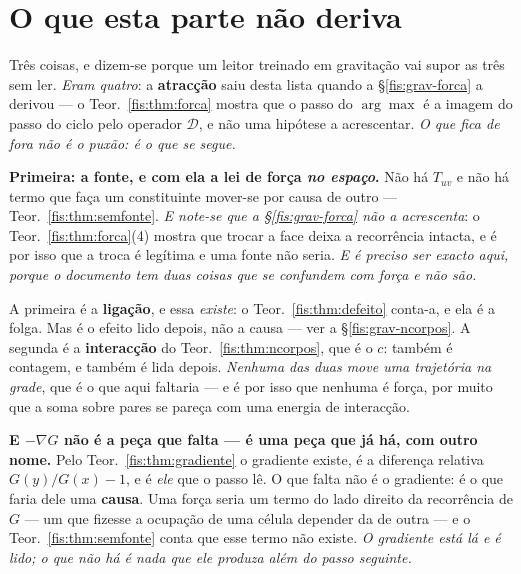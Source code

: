 \documentclass[livro.tex]{subfiles}
\begin{document}

\section{O que esta parte não deriva}\label{fis:grav-naoderiva}

\noindent Três coisas, e dizem-se porque um leitor treinado em gravitação vai
supor as três sem ler. \emph{Eram quatro}: a \textbf{atracção} saiu desta lista
quando a §\ref{fis:grav-forca} a derivou --- o Teor.~\ref{fis:thm:forca} mostra
que o passo do $\arg\max$ é a imagem do passo do ciclo pelo operador
$\mathcal{D}$, e não uma hipótese a acrescentar. \emph{O que fica de fora não é
o puxão: é o que se segue.}

\medskip\noindent\textbf{Primeira: a fonte, e com ela a lei de força \emph{no
espaço}.} Não há $T_{uv}$ e não há termo que faça um constituinte mover-se por
causa de outro --- Teor.~\ref{fis:thm:semfonte}. \emph{E note-se que a
§\ref{fis:grav-forca} não a acrescenta}: o Teor.~\ref{fis:thm:forca}(4) mostra
que trocar a face deixa a recorrência intacta, e é por isso que a troca é
legítima e uma fonte não seria. \emph{E é preciso ser exacto
aqui, porque o documento tem duas coisas que se confundem com força e não são.}

\medskip\noindent A primeira é a \textbf{ligação}, e essa \emph{existe}: o
Teor.~\ref{fis:thm:defeito} conta-a, e ela é a folga. Mas é o efeito lido depois,
não a causa --- ver a §\ref{fis:grav-ncorpos}. A segunda é a \textbf{interacção}
do Teor.~\ref{fis:thm:ncorpos}, que é o $c$: também é contagem, e também é lida
depois. \emph{Nenhuma das duas move uma trajetória na grade}, que é o que aqui
faltaria --- e é por isso que nenhuma é força, por muito que a soma sobre pares
se pareça com uma energia de interacção.

\medskip\noindent\textbf{E $-\nabla G$ não é a peça que falta --- é uma peça que
já há, com outro nome.} Pelo Teor.~\ref{fis:thm:gradiente} o gradiente existe, é
a diferença relativa $G(y)/G(x)-1$, e é \emph{ele} que o passo lê. O que falta não é o
gradiente: é o que faria dele uma \textbf{causa}. Uma força seria um termo do
lado direito da recorrência de $G$ --- um que fizesse a ocupação de uma célula
depender da de outra --- e o Teor.~\ref{fis:thm:semfonte} conta que esse termo não
existe. \emph{O gradiente está lá e é lido; o que não há é nada que ele produza
além do passo seguinte.}
\end{document}
